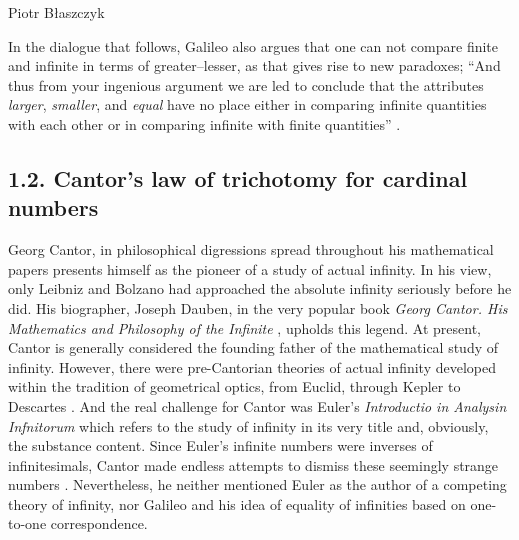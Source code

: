 \begin{artengenv}{Piotr Błaszczyk}

In the dialogue that  follows, Galileo also argues that one can not compare finite and infinite in terms of 
greater--lesser, as that gives rise to new paradoxes; 
``And thus from your ingenious argument we are led to 
conclude that the attributes \textit{larger}, \textit{smaller}, and \textit{equal}
have no place either in comparing infinite quantities with each 
other or in comparing infinite with finite quantities'' \parencite[33]{ref_GG56}. 

\subsection{1.2. Cantor's  law of trichotomy for cardinal numbers}
Georg Cantor, in  philosophical 
digressions spread throughout his mathematical papers presents himself as the pioneer of a study of actual infinity. In his view,   only  Leibniz and Bolzano had approached the absolute infinity seriously before he did. His biographer, Joseph Dauben, in the very popular book \textit{Georg Cantor. His Mathematics and Philosophy of the Infinite} \parencite*{ref_jd}, upholds this legend. At present,  Cantor is generally considered the founding father of the mathematical study of infinity.  However,  there were pre-Cantorian theories of actual infinity developed within the tradition of geometrical optics, from Euclid, through Kepler to Descartes \parencite[see][]{ref_pb20}. And the real challenge for Cantor was  Euler's \textit{Introductio in Analysin Infnitorum} \parencite*{ref_LE48} which refers to the study of infinity in its very title and, obviously, the substance content. Since Euler's infinite numbers were inverses of infinitesimals, Cantor made endless attempts to dismiss these seemingly strange numbers \parencite[see][]{ref_bf}. Nevertheless, he neither mentioned Euler as the author of a competing theory of infinity, nor Galileo and his idea of equality of infinities based on one-to-one correspondence. 


\end{artengenv}
